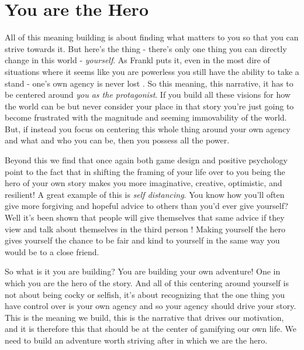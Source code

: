 \documentclass[11pt]{book}
\begin{document}
\section{You are the Hero}
All of this meaning building is about finding what matters to you so that you can strive towards it. But here's the thing - there's only one thing you can directly change in this world - \textit{yourself}. As Frankl puts it, even in the most dire of situations where it seems like you are powerless you still have the ability to take a stand - one's own agency is never lost \cite{frankl}. So this meaning, this narrative, it has to be centered around \textit{you as the protagonist}. If you build all these visions for how the world can be but never consider your place in that story you're just going to become frustrated with the magnitude and seeming immovability of the world. But, if instead you focus on centering this whole thing around your own agency and what and who you can be, then you possess all the power. 
\newline

Beyond this we find that once again both game design \cite{superbetter} and positive psychology \cite{seligman} point to the fact that in shifting the framing of your life over to you being the hero of your own story makes you more imaginative, creative, optimistic, and resilient! A great example of this is \textit{self distancing}. You know how you'll often give more forgiving and hopeful advice to others than you'd ever give yourself? Well it's been shown that people will give themselves that same advice if they view and talk about themselves in the third person \cite{superbetter}! Making yourself the hero gives yourself the chance to be fair and kind to yourself in the same way you would be to a close friend.
\newline

So what is it you are building? You are building your own adventure! One in which you are the hero of the story. And all of this centering around yourself is not about being cocky or selfish, it's about recognizing that the one thing you have control over is your own agency and so your agency should drive your story. This is the meaning we build, this is the narrative that drives our motivation, and it is therefore this that should be at the center of gamifying our own life. We need to build an adventure worth striving after in which we are the hero. 
\newline
\end{document}
